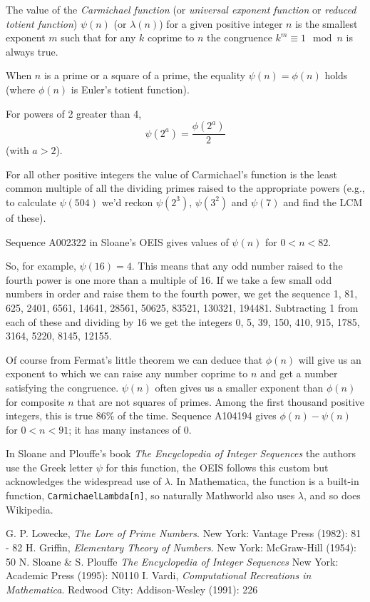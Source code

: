 \documentclass[12pt]{article}
\begin{document}
The value of the {\em Carmichael function} (or {\em universal exponent function} or {\em reduced totient function}) $\psi(n)$ (or $\lambda(n)$) for a given positive integer $n$ is the smallest exponent $m$ such that for any $k$ coprime to $n$ the congruence $k^m \equiv 1 \mod n$ is always true.

When $n$ is a prime or a square of a prime, the equality $\psi(n) = \phi(n)$ holds (where $\phi(n)$ is Euler's totient function).

For powers of 2 greater than 4, $$\psi(2^a) = \frac{\phi(2^a)}{2}$$ (with $a > 2$).

For all other positive integers the value of Carmichael's function is the least common multiple of all the dividing primes raised to the appropriate powers (e.g., to calculate $\psi(504)$ we'd reckon $\psi(2^3)$, $\psi(3^2)$ and $\psi(7)$ and find the LCM of these).

Sequence A002322 in Sloane's OEIS gives values of $\psi(n)$ for $0 < n < 82$.

So, for example, $\psi(16) = 4$. This means that any odd number raised to the fourth power is one more than a multiple of 16. If we take a few small odd numbers in order and raise them to the fourth power, we get the sequence 1, 81, 625, 2401, 6561, 14641, 28561, 50625, 83521, 130321, 194481. Subtracting 1 from each of these and dividing by 16 we get the integers 0, 5, 39, 150, 410, 915, 1785, 3164, 5220, 8145, 12155.

Of course from Fermat's little theorem we can deduce that $\phi(n)$ will give us an exponent to which we can raise any number coprime to $n$ and get a number satisfying the congruence. $\psi(n)$ often gives us a smaller exponent than $\phi(n)$ for composite $n$ that are not squares of primes. Among the first thousand positive integers, this is true 86\% of the time. Sequence A104194 gives $\phi(n) - \psi(n)$ for $0 < n < 91$; it has many instances of 0.

In Sloane and Plouffe's book {\it The Encyclopedia of Integer Sequences} the authors use the Greek letter $\psi$ for this function, the OEIS follows this custom but acknowledges the widespread use of $\lambda$. In Mathematica, the function is a built-in function, \verb=CarmichaelLambda[n]=, so naturally Mathworld also uses $\lambda$, and so does Wikipedia.

\begin{thebibliography}{3}
 G. P. Lowecke, {\it The Lore of Prime Numbers}. New York: Vantage Press (1982): 81 - 82
 H. Griffin, {\it Elementary Theory of Numbers}. New York: McGraw-Hill (1954): 50
 N. Sloane \& S. Plouffe {\it The Encyclopedia of Integer Sequences} New York: Academic Press (1995): N0110
 I. Vardi, {\it Computational Recreations in Mathematica}. Redwood City: Addison-Wesley (1991): 226 
\end{thebibliography}
\end{document}
